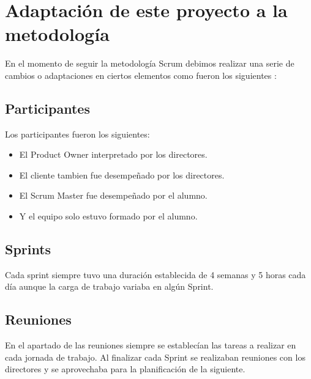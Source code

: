 \section{Adaptación de este proyecto a la metodología }
 En el momento de seguir la metodología Scrum debimos realizar una serie de cambios o adaptaciones en ciertos elementos como fueron los siguientes :
\subsection{Participantes}
Los participantes fueron los siguientes:
\begin{itemize}
\item El Product Owner interpretado por los  directores.
\item El cliente tambien fue desempeñado por los directores.
\item El Scrum Master fue desempeñado por el alumno.
\item  Y el equipo solo estuvo formado por el alumno.

\end{itemize}

\subsection{Sprints}
Cada sprint siempre tuvo una duración establecida de 4 semanas y 5 horas cada día aunque la carga de trabajo variaba en algún Sprint.


\subsection{Reuniones}

En el apartado de las reuniones siempre se establecían las tareas a realizar en cada jornada de trabajo. Al finalizar cada Sprint se realizaban reuniones con los directores y se aprovechaba para la planificación de la siguiente.
